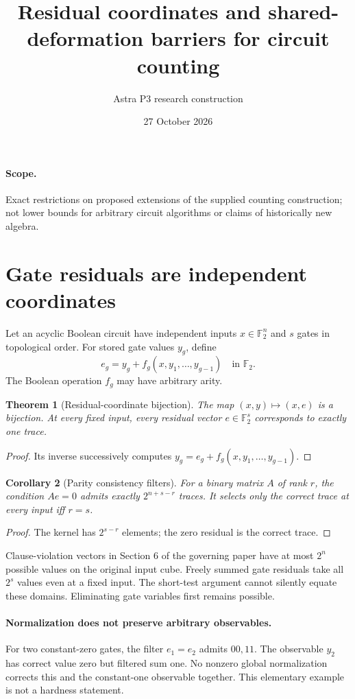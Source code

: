 \documentclass[11pt]{article}
\title{Residual coordinates and shared-deformation barriers for circuit counting}
\author{Astra P3 research construction}
\date{27 October 2026}
\newtheorem{theorem}{Theorem}
\newtheorem{corollary}[theorem]{Corollary}
\begin{document}
\maketitle
\paragraph{Scope.} Exact restrictions on proposed extensions of the supplied
counting construction; not lower bounds for arbitrary circuit algorithms or
claims of historically new algebra.

\section{Gate residuals are independent coordinates}
Let an acyclic Boolean circuit have independent inputs $x\in\mathbb F_2^n$
and $s$ gates in topological order. For stored gate values $y_g$, define
\[
 e_g=y_g+f_g(x,y_1,\ldots,y_{g-1})\quad\text{in }\mathbb F_2.
\]
The Boolean operation $f_g$ may have arbitrary arity.
\begin{theorem}[Residual-coordinate bijection]
The map $(x,y)\mapsto(x,e)$ is a bijection. At every fixed input, every
residual vector $e\in\mathbb F_2^s$ corresponds to exactly one trace.
\end{theorem}
\begin{proof}
Its inverse successively computes $y_g=e_g+f_g(x,y_1,\ldots,y_{g-1})$.
\end{proof}
\begin{corollary}[Parity consistency filters]
For a binary matrix $A$ of rank $r$, the condition $Ae=0$ admits exactly
$2^{n+s-r}$ traces. It selects only the correct trace at every input iff $r=s$.
\end{corollary}
\begin{proof}
The kernel has $2^{s-r}$ elements; the zero residual is the correct trace.
\end{proof}
Clause-violation vectors in Section 6 of the governing paper have at most
$2^n$ possible values on the original input cube. Freely summed gate residuals
take all $2^s$ values even at a fixed input. The short-test argument cannot
silently equate these domains. Eliminating gate variables first remains possible.

\paragraph{Normalization does not preserve arbitrary observables.}
For two constant-zero gates, the filter $e_1=e_2$ admits $00,11$.
The observable $y_2$ has correct value zero but filtered sum one. No nonzero
global normalization corrects this and the constant-one observable together.
This elementary example is not a hardness statement.
\end{document}
